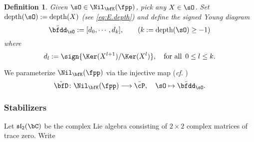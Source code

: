 \documentclass[12pt,a4paper]{amsart}
\makeatletter
\newcommand{\depth}{\mathrm{depth}}
\def\inn#1#2{\left\langle
      \def\ta{#1}\def\tb{#2}
      \ifx\ta\@empty{\;} \else {\ta}\fi ,
      \ifx\tb\@empty{\;} \else {\tb}\fi
      \right\rangle}
\def\fsl{\mathfrak{sl}}
\newcommand{\slt}{\operatorname{SL}_2(\mathbb{R})}
\numberwithin{equation}{section}
\newtheorem{defn}[thm]{Definition}
\theoremstyle{remark}
\def\slt{\fsl_2(\bC)}
\def\fggR{\fgg_\bR}
\def\ssP{{\ddot\cP}}
\def\ssD{\ddot{\bfD}}
\def\ssdd{\ddot{\bfdd}}
\makeatother
\begin{document}






\begin{defn}\label{def:dec.sNG}
  Given $\sO\in \Nil_{\bfK}(\fpp)$, pick any $X\in \sO$.
  Set $\depth(\sO) := \depth(X)$ (see \cref{eq:E.depth}) and define the signed Young
  diagram
  \[
    \ssdd_\sO:= [d_0,\cdots, d_k], \qquad (k:=\depth(\sO)\geq -1)
    \]
    where
    \[
   d_l:= \sign{\Ker(X^{l+1})/\Ker(X^{l})}, \quad \textrm{for all }\, 0\leq l\leq k.
    \]
\end{defn}

We parameterize $\Nil_{\bfK}(\fpp)$ via the injective map (\emph{cf}. \cite{DKP2})
\[
\ssD \colon
\Nil_{\bfK}(\fpp) \longrightarrow  \ssP,\quad \sO\mapsto \ssdd_\sO.
\]

\subsubsection{Stabilizers}\label{sec:KX}
Let $\slt$ be the complex Lie algebra consisting of $2\times 2$ complex matrices
of trace zero. Write
\end{document}
